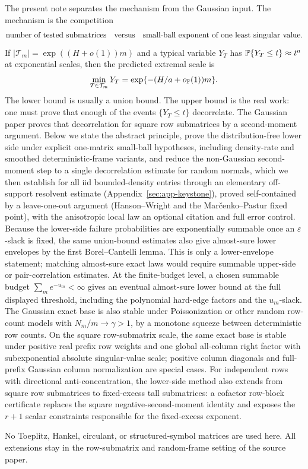 The present note separates the mechanism from the Gaussian input.  The
mechanism is the competition
\[
  \text{number of tested submatrices}\quad\hbox{versus}\quad
  \text{small-ball exponent of one least singular value}.
\]
If \(|\mathcal T_m|=\exp((H+o(1))m)\) and a typical variable
\(Y_T\) has \(\mathbb{P}\{Y_T\le t\}\approx t^a\) at exponential scales, then the
predicted extremal scale is
\[
  \min_{T\in\mathcal T_m}Y_T=\exp\{-(H/a+o_{\mathbb{P}}(1))m\}.
\]
The lower bound is usually a union bound.  The upper bound is the real work:
one must prove that enough of the events \(\{Y_T\le t\}\) decorrelate.  The
Gaussian paper proves that decorrelation for square row submatrices by a
second-moment argument.  Below we state the abstract principle, prove the
distribution-free lower side under explicit one-matrix small-ball hypotheses,
including density-rate and smoothed deterministic-frame variants, and reduce the
non-Gaussian second-moment step to a single decorrelation estimate for random
normals, which we then establish for all iid bounded-density entries through an
elementary off-support resolvent estimate
(Appendix~\ref{sec:app-keystone}), proved self-contained by a leave-one-out argument
(Hanson--Wright and the Mar\v{c}enko--Pastur fixed point), with the anisotropic local
law an optional citation and full error control.
Because the lower-side failure probabilities are exponentially summable once an
\(\varepsilon\)-slack is fixed, the same union-bound estimates also give
almost-sure lower envelopes by the first Borel--Cantelli lemma.  This is only a
lower-envelope statement; matching almost-sure exact laws would require
summable upper-side or pair-correlation estimates.
At the finite-budget level, a chosen summable budget \(\sum_m e^{-u_m}<\infty\)
gives an eventual almost-sure lower bound at the full displayed threshold,
including the polynomial hard-edge factors and the \(u_m\)-slack.
The Gaussian exact base is also stable under Poissonization or other random
row-count models with \(N_m/m\to\gamma>1\), by a monotone squeeze between
deterministic row counts.  On the square row-submatrix scale, the same exact
base is stable under positive real prefix row weights and one global all-column
right factor with subexponential absolute singular-value scale; positive column
diagonals and full-prefix Gaussian column normalization are special cases.
For independent rows with directional anti-concentration, the lower-side method
also extends from square row submatrices to fixed-excess tall submatrices: a
cofactor row-block certificate replaces the square negative-second-moment
identity and exposes the \(r+1\) scalar constraints responsible for the
fixed-excess exponent.

No Toeplitz, Hankel, circulant, or structured-symbol matrices are used here.
All extensions stay in the row-submatrix and random-frame setting of the source
paper.
